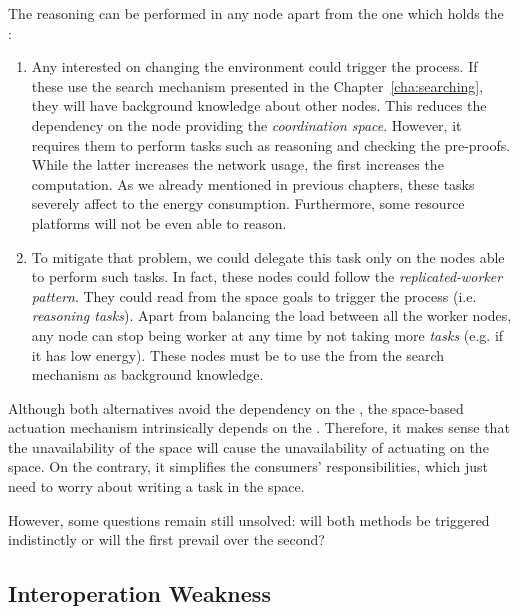 The reasoning can be performed in any node apart from the one which holds the \Space{}:

\begin{enumerate}
  \item Any \consumer{} interested on changing the environment could trigger the process.
	If these \consumers{} use the search mechanism presented in the Chapter~\ref{cha:searching}, they will have background knowledge about other nodes.
	This reduces the dependency on the node providing the \emph{coordination space}. %
	However, it requires them to perform tasks such as reasoning and checking the pre-proofs.
	While the latter increases the network usage, the first increases the computation.
	As we already mentioned in previous chapters, these tasks severely affect to the energy consumption.
	Furthermore, some resource platforms will not be even able to reason.
	
  \item To mitigate that problem, we could delegate this task only on the nodes able to perform such tasks.
	In fact, these nodes could follow the \emph{replicated-worker pattern}.
	They could read from the space goals to trigger the process (i.e. \emph{reasoning tasks}).
	Apart from balancing the load between all the worker nodes, any node can stop being worker at any time by not taking more \emph{tasks} (e.g. if it has low energy).
	These nodes must be \consumers{} to use the \clues{} from the search mechanism as background knowledge.
\end{enumerate}


Although both alternatives avoid the dependency on the \Space{}, the space-based actuation mechanism intrinsically depends on the \Space{}.
Therefore, it makes sense that the unavailability of the space will cause the unavailability of actuating on the space.
On the contrary, it simplifies the consumers' responsibilities, which just need to worry about writing a task in the space.


However, some questions remain still unsolved: will both methods be triggered indistinctly or will the first prevail over the second?


\subsection{Interoperation Weakness}

